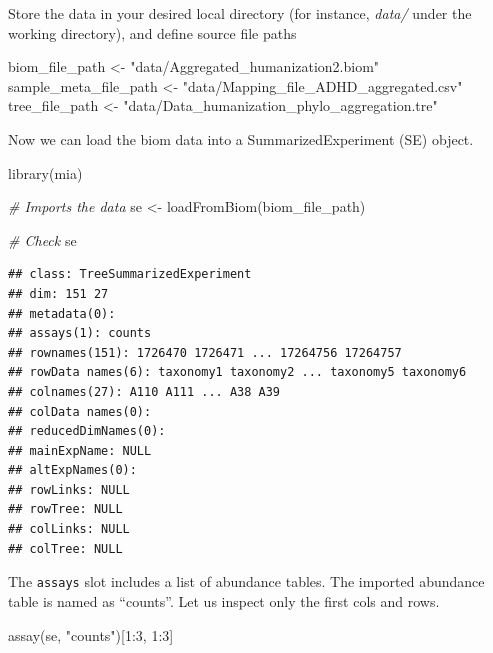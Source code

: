 \documentclass[
]{book}
\newenvironment{Shaded}{\begin{snugshade}}{\end{snugshade}}
\newcommand{\CommentTok}[1]{\textcolor[rgb]{0.56,0.35,0.01}{\textit{#1}}}
\newcommand{\DecValTok}[1]{\textcolor[rgb]{0.00,0.00,0.81}{#1}}
\newcommand{\FunctionTok}[1]{\textcolor[rgb]{0.00,0.00,0.00}{#1}}
\newcommand{\NormalTok}[1]{#1}
\newcommand{\OtherTok}[1]{\textcolor[rgb]{0.56,0.35,0.01}{#1}}
\newcommand{\SpecialCharTok}[1]{\textcolor[rgb]{0.00,0.00,0.00}{#1}}
\newcommand{\StringTok}[1]{\textcolor[rgb]{0.31,0.60,0.02}{#1}}
\begin{document}
Store the data in your desired local directory (for instance, \emph{data/} under the
working directory), and define source file paths

\begin{Shaded}
\begin{Highlighting}[]
\NormalTok{biom\_file\_path }\OtherTok{\textless{}{-}} \StringTok{"data/Aggregated\_humanization2.biom"}
\NormalTok{sample\_meta\_file\_path }\OtherTok{\textless{}{-}} \StringTok{"data/Mapping\_file\_ADHD\_aggregated.csv"}
\NormalTok{tree\_file\_path }\OtherTok{\textless{}{-}} \StringTok{"data/Data\_humanization\_phylo\_aggregation.tre"}
\end{Highlighting}
\end{Shaded}

Now we can load the biom data into a SummarizedExperiment (SE) object.

\begin{Shaded}
\begin{Highlighting}[]
\FunctionTok{library}\NormalTok{(mia)}

\CommentTok{\# Imports the data}
\NormalTok{se }\OtherTok{\textless{}{-}} \FunctionTok{loadFromBiom}\NormalTok{(biom\_file\_path)}

\CommentTok{\# Check}
\NormalTok{se}
\end{Highlighting}
\end{Shaded}

\begin{verbatim}
## class: TreeSummarizedExperiment 
## dim: 151 27 
## metadata(0):
## assays(1): counts
## rownames(151): 1726470 1726471 ... 17264756 17264757
## rowData names(6): taxonomy1 taxonomy2 ... taxonomy5 taxonomy6
## colnames(27): A110 A111 ... A38 A39
## colData names(0):
## reducedDimNames(0):
## mainExpName: NULL
## altExpNames(0):
## rowLinks: NULL
## rowTree: NULL
## colLinks: NULL
## colTree: NULL
\end{verbatim}

The \texttt{assays} slot includes a list of abundance tables. The imported
abundance table is named as ``counts''. Let us inspect only the first
cols and rows.

\begin{Shaded}
\begin{Highlighting}[]
\FunctionTok{assay}\NormalTok{(se, }\StringTok{"counts"}\NormalTok{)[}\DecValTok{1}\SpecialCharTok{:}\DecValTok{3}\NormalTok{, }\DecValTok{1}\SpecialCharTok{:}\DecValTok{3}\NormalTok{]}
\end{Highlighting}
\end{Shaded}
\end{document}
